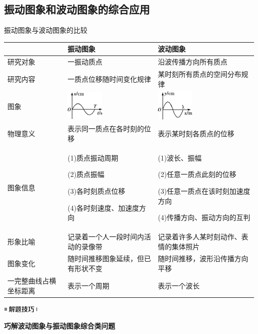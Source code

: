 \newpage
\subsection{振动图象和波动图象的综合应用}

振动图象与波动图象的比较

\begin{longtable}[]{@{}m{2cm}m{5cm}m{5cm}@{}}
\toprule
& 振动图象 & 波动图象\tabularnewline
\midrule
\endhead
研究对象 & 一振动质点 & 沿波传播方向所有质点\tabularnewline
研究内容 & 一质点位移随时间变化规律 &
某时刻所有质点的空间分布规律\tabularnewline
图象 &
\includegraphics[width=0.72639in,height=0.57569in]{media/image532.png} &
\includegraphics[width=0.71667in,height=0.58472in]{media/image533.png}\tabularnewline
物理意义 & 表示同一质点在各时刻的位移 &
表示某时刻各质点的位移\tabularnewline
\begin{minipage}[t]{0.30\columnwidth}\raggedright
图象信息\strut
\end{minipage} & \begin{minipage}[t]{0.30\columnwidth}\raggedright
(1)质点振动周期

(2)质点振幅

(3)各时刻质点位移

(4)各时刻速度、加速度方向\strut
\end{minipage} & \begin{minipage}[t]{0.30\columnwidth}\raggedright
(1)波长、振幅

(2)任意一质点此刻的位移

(3)任意一质点在该时刻加速度方向

(4)传播方向、振动方向的互判\strut
\end{minipage}\tabularnewline
形象比喻 & 记录着一个人一段时间内活动的录像带 &
记录着许多人某时刻动作、表情的集体照片\tabularnewline
图象变化 & 随时间推移图象延续，但已有形状不变 &
随时间推移，波形沿传播方向平移\tabularnewline
一完整曲线占横坐标距离 & 表示一个周期 & 表示一个波长\tabularnewline
\bottomrule
\end{longtable}

\begin{center}\includegraphics[width=0.70764in,height=0.12292in]{media/image37.png}\end{center}
\begin{center}
  \textbf{巧解波动图象与振动图象综合类问题}
\end{center}

